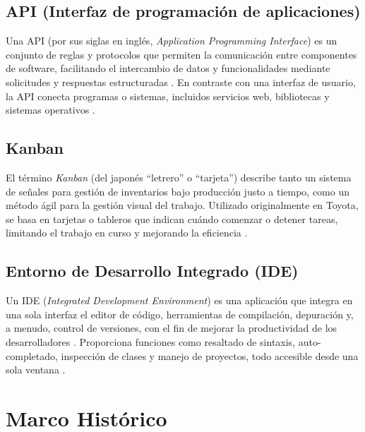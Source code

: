 \documentclass[12pt]{article}
\begin{document}
	\subsection{API (Interfaz de programación de aplicaciones)}

	\hspace{1.27cm}Una API (por sus siglas en inglés, \emph{Application Programming Interface}) es un conjunto de reglas y protocolos que permiten la comunicación entre componentes de software, facilitando el intercambio de datos y funcionalidades mediante solicitudes y respuestas estructuradas \parencite{aws_api,oracle_api}. En contraste con una interfaz de usuario, la API conecta programas o sistemas, incluidos servicios web, bibliotecas y sistemas operativos \parencite{wikipedia_api}.

	\subsection{Kanban}

	\hspace{1.27cm}El término \emph{Kanban} (del japonés “letrero” o “tarjeta”) describe tanto un sistema de señales para gestión de inventarios bajo producción justo a tiempo, como un método ágil para la gestión visual del trabajo. Utilizado originalmente en Toyota, se basa en tarjetas o tableros que indican cuándo comenzar o detener tareas, limitando el trabajo en curso y mejorando la eficiencia \parencite{wikipedia_kanban_dev,asana_kanban}.

	\subsection{Entorno de Desarrollo Integrado (IDE)}

	\hspace{1.27cm}Un IDE (\emph{Integrated Development Environment}) es una aplicación que integra en una sola interfaz el editor de código, herramientas de compilación, depuración y, a menudo, control de versiones, con el fin de mejorar la productividad de los desarrolladores \parencite{eswiki_ide,geeksforgeeks_ide}. Proporciona funciones como resaltado de sintaxis, auto-completado, inspección de clases y manejo de proyectos, todo accesible desde una sola ventana \parencite{eswiki_ide}.

	\section{Marco Histórico}
\end{document}
